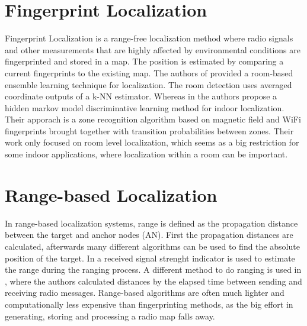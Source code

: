 \section{Fingerprint Localization}
Fingerprint Localization is a range-free localization method where radio signals and other measurements that are highly affected by environmental conditions are fingerprinted and stored in a map. The position is estimated by comparing a current fingerprints to the existing map. The authors of \cite{Taniuchi} provided a room-based ensemble learning technique for localization. The room detection uses averaged coordinate outputs of a k-NN estimator. Whereas in \cite{Carrera2} the authors propose a hidden markov model discriminative learning method for indoor localization. Their apporach is a zone recognition algorithm based on magnetic field and WiFi fingerprints brought together with transition probabilities between zones. Their work only focused on room level localization, which seems as a big restriction for some indoor applications, where localization within a room can be important.

\section{Range-based Localization}
In range-based localization systems, range is defined as the propagation distance between the target and anchor nodes (AN). First the propagation distances are calculated, afterwards many different algorithms can be used to find the absolute position of the target. In \cite{Horus} a received signal strenght indicator is used to estimate the range during the ranging process. A different method to do ranging is used in \cite{IEEE}, where the authors calculated distances by the elapsed time between sending and receiving radio messages. Range-based algorithms are often much lighter and computationally less expensive than fingerprinting methods, as the big effort in generating, storing and processing a radio map falls away. 

